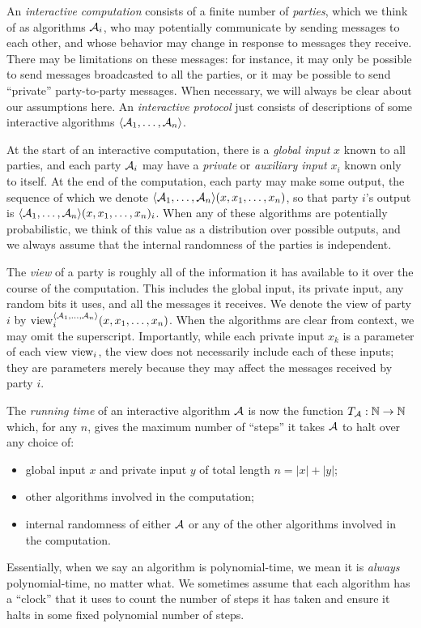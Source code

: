 An \emph{interactive computation} consists of a finite number of \emph{parties},
which we think of as algorithms $\mathcal{A}_i$, who may potentially communicate by
sending messages to each other, and whose behavior may change in response to
messages they receive. There may be limitations on these messages: for instance,
it may only be possible to send messages broadcasted to all the parties, or it
may be possible to send ``private'' party-to-party messages. When necessary, we
will always be clear about our assumptions here. An \emph{interactive protocol}
just consists of descriptions of some interactive algorithms $\langle\mathcal{A}_1, \dots,
\mathcal{A}_n\rangle$.

At the start of an interactive computation, there is a \emph{global input} $x$
known to all parties, and each party $\mathcal{A}_i$ may have a \emph{private} or
\emph{auxiliary input} $x_i$ known only to itself. At the end of the
computation, each party may make some output, the sequence of which we denote
$\langle\mathcal{A}_1, \dots, \mathcal{A}_n\rangle(x, x_1, \dots, x_n)$, so that party $i$'s output is
$\langle\mathcal{A}_1, \dots, \mathcal{A}_n\rangle(x, x_1, \dots, x_n)_i$. When any of these algorithms
are potentially probabilistic, we think of this value as a distribution over
possible outputs, and we always assume that the internal randomness of the
parties is independent.

The \emph{view} of a party is roughly all of the information it has available to
it over the course of the computation. This includes the global input, its
private input, any random bits it uses, and all the messages it receives. We
denote the view of party $i$ by $\operatorname{view}_i^{\langle\mathcal{A}_1, \dots, \mathcal{A}_n\rangle}(x, x_1,
\dots, x_n)$. When the algorithms are clear from context, we may omit the
superscript. Importantly, while each private input $x_k$ is a parameter of each
view $\operatorname{view}_i$, the view does not necessarily include each of these inputs; they
are parameters merely because they may affect the messages received by party
$i$.

The \emph{running time} of an interactive algorithm $\mathcal{A}$ is now the function
$T_{\mathcal{A}}: \mathbb{N}\to\mathbb{N}$ which, for any $n$, gives the maximum number of ``steps'' it
takes $\mathcal{A}$ to halt over any choice of:
\begin{itemize}
  \item global input $x$ and private input $y$ of total length $n = |x| + |y|$;
  \item other algorithms involved in the computation;
  \item internal randomness of either $\mathcal{A}$ or any of the other algorithms
    involved in the computation.
\end{itemize}
Essentially, when we say an algorithm is polynomial-time, we mean it is
\emph{always} polynomial-time, no matter what. We sometimes assume that each
algorithm has a ``clock'' that it uses to count the number of steps it has taken
and ensure it halts in some fixed polynomial number of steps.

